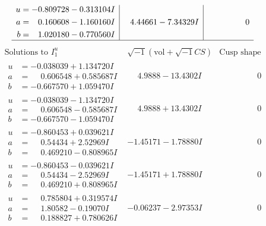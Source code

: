 \documentclass[1p]{elsarticle_modified}
\theoremstyle{definition}
\newcommand{\I}{\sqrt{-1}}
\begin{document}
$$\begin{array}{c|c|c}
\begin{aligned}
u &= -0.809728 - 0.313104 I \\
a &= \phantom{-}0.160608 - 1.160160 I \\
b &= \phantom{-}1.020180 - 0.770560 I\end{aligned}
 & \phantom{-}4.44661 - 7.34329 I & \phantom{-0.000000 } 0\\
 \hline 
 \end{array}$$\newpage$$\begin{array}{c|c|c}  
\text{Solutions to }I^u_{1}& \I (\text{vol} + \sqrt{-1}CS) & \text{Cusp shape}\\
 \hline 
\begin{aligned}
u &= -0.038039 + 1.134720 I \\
a &= \phantom{-}0.606548 + 0.585687 I \\
b &= -0.667570 + 1.059470 I\end{aligned}
 & \phantom{-}4.9888 - 13.4302 I & \phantom{-0.000000 } 0 \\ \hline\begin{aligned}
u &= -0.038039 - 1.134720 I \\
a &= \phantom{-}0.606548 - 0.585687 I \\
b &= -0.667570 - 1.059470 I\end{aligned}
 & \phantom{-}4.9888 + 13.4302 I & \phantom{-0.000000 } 0 \\ \hline\begin{aligned}
u &= -0.860453 + 0.039621 I \\
a &= \phantom{-}0.54434 + 2.52969 I \\
b &= \phantom{-}0.469210 - 0.808965 I\end{aligned}
 & -1.45171 - 1.78880 I & \phantom{-0.000000 } 0 \\ \hline\begin{aligned}
u &= -0.860453 - 0.039621 I \\
a &= \phantom{-}0.54434 - 2.52969 I \\
b &= \phantom{-}0.469210 + 0.808965 I\end{aligned}
 & -1.45171 + 1.78880 I & \phantom{-0.000000 } 0 \\ \hline\begin{aligned}
u &= \phantom{-}0.785804 + 0.319574 I \\
a &= \phantom{-}1.80582 - 0.19070 I \\
b &= \phantom{-}0.188827 + 0.780626 I\end{aligned}
 & -0.06237 - 2.97353 I & \phantom{-0.000000 } 0 \\ \hline\begin{aligned}

\end{aligned}
\end{array}$$
\end{document}
